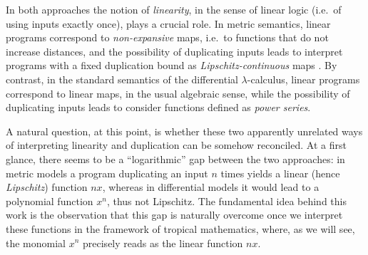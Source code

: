 In both approaches the notion of \emph{linearity}, in the sense of linear logic \cite{girardLl} (i.e.~of using inputs exactly once), plays a crucial role.
In metric semantics, linear programs correspond to \emph{non-expansive} maps, i.e.~to functions that do not increase distances, and the possibility of duplicating inputs leads to interpret programs with a fixed duplication bound as \emph{Lipschitz-continuous} maps \cite{Gaboardi2017}.
By contrast, in the standard semantics of the differential $\lambda$-calculus, linear programs correspond to linear maps, in the usual algebraic sense, while the possibility of duplicating inputs leads to consider functions defined as \emph{power series}.


A natural question, at this point, is whether these two apparently unrelated ways of interpreting linearity and duplication can be somehow reconciled. At a first glance, there seems to be a  ``logarithmic'' gap between the two approaches:
in metric models a program duplicating an input $n$ times yields a {linear} (hence \emph{Lipschitz}) function $n x$, whereas in differential models it would lead to a {polynomial} function $x^{n}$, thus not Lipschitz. The fundamental idea behind this work is the observation that 
this gap is naturally overcome once we interpret these functions in the framework of tropical mathematics, where, as we will see, the monomial $x^{n}$ precisely reads as the linear function $n x$.

